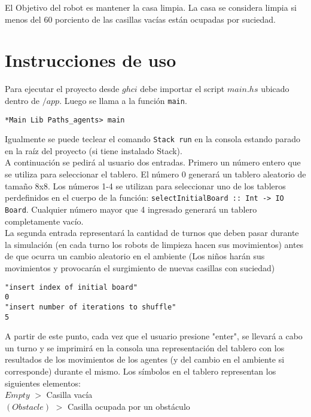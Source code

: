 \documentclass[a4paper,12pt]{article}
\def\code#1{\texttt{#1}}
\begin{document}
El Objetivo del robot es mantener la casa limpia. La casa se considera limpia si menos del 60 porciento de las casillas vacías están ocupadas por suciedad.

\section*{Instrucciones de uso}
Para ejecutar el proyecto desde $ghci$ debe importar el script $main.hs$ ubicado dentro de $/app$. Luego se llama a la función \code{main}.

\begin{lstlisting}
*Main Lib Paths_agents> main
\end{lstlisting}

Igualmente se puede teclear el comando \code{Stack run} en la consola estando parado en la raíz del proyecto (si tiene instalado Stack).\\

A continuación se pedirá al usuario dos entradas. Primero un número entero que se utiliza para seleccionar el tablero. El
número 0 generará un tablero aleatorio de tamaño 8x8. Los números 1-4 se utilizan para seleccionar uno de los tableros perdefinidos en el cuerpo de la función: \code{selectInitialBoard :: Int -> IO Board}. Cualquier número mayor que 4 ingresado generará un tablero completamente vacío.\\
La segunda entrada representará la cantidad de turnos que deben pasar durante la simulación (en cada turno los robots de limpieza hacen sus movimientos) antes de que ocurra un cambio aleatorio en el ambiente (Los niños harán sus movimientos y provocarán el surgimiento de nuevas casillas con suciedad)

\begin{lstlisting}
"insert index of initial board"
0
"insert number of iterations to shuffle"
5
\end{lstlisting}

A partir de este punto, cada vez que el usuario presione "enter", se llevará a cabo un turno y se imprimirá en la consola una representación del tablero con los resultados de los movimientos de los agentes (y del cambio en el ambiente si corresponde) durante el mismo. Los símbolos en el tablero representan los siguientes elementos:\\

\code{$Empty$} $>$ Casilla vacía\\

\code{$(Obstacle)$} $>$ Casilla ocupada por un obstáculo\\
\end{document}
